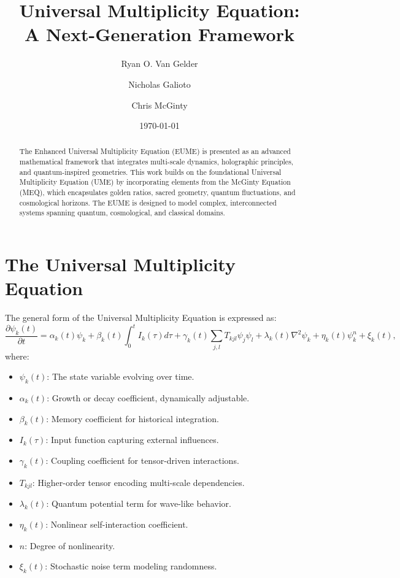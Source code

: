 \documentclass{article}
\theoremstyle{plain}
\begin{document}
\title{Universal Multiplicity Equation: \\ A Next-Generation Framework}

\author[1]{Ryan O. Van Gelder}
\author[1]{Nicholas Galioto}
\author[2]{Chris McGinty}
\date{\today}

\maketitle
\begin{abstract}
The Enhanced Universal Multiplicity Equation (EUME) is presented as an advanced mathematical framework that integrates multi-scale dynamics, holographic principles, and quantum-inspired geometries. This work builds on the foundational Universal Multiplicity Equation (UME) by incorporating elements from the McGinty Equation (MEQ), which encapsulates golden ratios, sacred geometry, quantum fluctuations, and cosmological horizons. The EUME is designed to model complex, interconnected systems spanning quantum, cosmological, and classical domains.
\end{abstract}
\section{The Universal Multiplicity Equation}
The general form of the Universal Multiplicity Equation is expressed as:
\begin{equation}
\frac{\partial \psi_k(t)}{\partial t} = \alpha_k(t)\psi_k + \beta_k(t) \int_0^t I_k(\tau) d\tau + \gamma_k(t) \sum_{j,l} T_{kjl} \psi_j \psi_l + \lambda_k(t) \nabla^2 \psi_k + \eta_k(t) \psi_k^n + \xi_k(t),
\end{equation}
where:
\begin{itemize}
    \item $\psi_k(t)$: The state variable evolving over time.
    \item $\alpha_k(t)$: Growth or decay coefficient, dynamically adjustable.
    \item $\beta_k(t)$: Memory coefficient for historical integration.
    \item $I_k(\tau)$: Input function capturing external influences.
    \item $\gamma_k(t)$: Coupling coefficient for tensor-driven interactions.
    \item $T_{kjl}$: Higher-order tensor encoding multi-scale dependencies.
    \item $\lambda_k(t)$: Quantum potential term for wave-like behavior.
    \item $\eta_k(t)$: Nonlinear self-interaction coefficient.
    \item $n$: Degree of nonlinearity.
    \item $\xi_k(t)$: Stochastic noise term modeling randomness.
\end{itemize}
\end{document}
